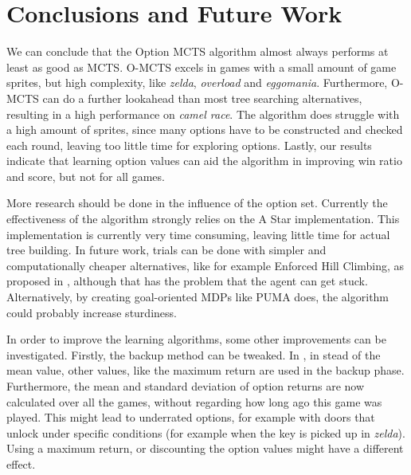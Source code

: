 \section{Conclusions and Future Work}
\label{sec:conclusion}
We can conclude that the Option MCTS algorithm almost always performs at least
as good as MCTS. O-MCTS excels in games with a small amount of game sprites, but
high complexity, like \textit{zelda}, \textit{overload} and \textit{eggomania}.
Furthermore, O-MCTS can do a further lookahead than most tree searching
alternatives, resulting in a high performance on \textit{camel race}. The
algorithm does struggle with a high amount of sprites, since many options have
to be constructed and checked each round, leaving too little time for exploring
options. Lastly, our results indicate that learning option values can aid the
algorithm in improving win ratio and score, but not for all games.

More research should be done in the influence of the option set. Currently the
effectiveness of the algorithm strongly relies on the A Star implementation.
This implementation is currently very time consuming, leaving little time for
actual tree building. In future work, trials can be done with simpler and
computationally cheaper alternatives, like for example Enforced Hill Climbing,
as proposed in \cite{ross2014general}, although that has the problem that the
agent can get stuck. Alternatively, by creating goal-oriented MDPs like PUMA
does, the algorithm could probably increase sturdiness.

In order to improve the learning algorithms, some other improvements can be
investigated. Firstly, the backup method can be tweaked. In
\cite{coulom2007efficient}, in stead of the mean value, other values, like the
maximum return are used in the backup phase. Furthermore, the mean and standard
deviation of option returns are now calculated over all the games, without
regarding how long ago this game was played. This might lead to underrated
options, for example with doors that unlock under specific conditions (for
example when the key is picked up in \textit{zelda}).  Using a maximum return,
or discounting the option values might have a different effect.

